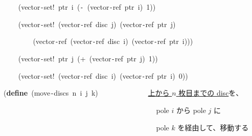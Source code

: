 \documentclass[a4paper,10pt]{article}
\def\mc{\relax}
\begin{document}
\noindent
\mbox{}{\tt\mc \ }{\tt\mc \ }{\tt\mc \ }{\tt\mc \ }(vector{\tt -}set!{\tt\mc \ }ptr{\tt\mc \ }i{\tt\mc \ }({\tt -}{\tt\mc \ }(vector{\tt -}ref{\tt\mc \ }ptr{\tt\mc \ }i){\tt\mc \ }1))

\noindent
\mbox{}{\tt\mc \ }{\tt\mc \ }{\tt\mc \ }{\tt\mc \ }(vector{\tt -}set!{\tt\mc \ }(vector{\tt -}ref{\tt\mc \ }disc{\tt\mc \ }j){\tt\mc \ }(vector{\tt -}ref{\tt\mc \ }ptr{\tt\mc \ }j)

\noindent
\mbox{}{\tt\mc \ }{\tt\mc \ }{\tt\mc \ }{\tt\mc \ }{\tt\mc \ }{\tt\mc \ }{\tt\mc \ }{\tt\mc \ }(vector{\tt -}ref{\tt\mc \ }(vector{\tt -}ref{\tt\mc \ }disc{\tt\mc \ }i){\tt\mc \ }(vector{\tt -}ref{\tt\mc \ }ptr{\tt\mc \ }i)))

\noindent
\mbox{}{\tt\mc \ }{\tt\mc \ }{\tt\mc \ }{\tt\mc \ }(vector{\tt -}set!{\tt\mc \ }ptr{\tt\mc \ }j{\tt\mc \ }(+{\tt\mc \ }(vector{\tt -}ref{\tt\mc \ }ptr{\tt\mc \ }j){\tt\mc \ }1))

\noindent
\mbox{}{\tt\mc \ }{\tt\mc \ }{\tt\mc \ }{\tt\mc \ }(vector{\tt -}set!{\tt\mc \ }(vector{\tt -}ref{\tt\mc \ }disc{\tt\mc \ }i){\tt\mc \ }(vector{\tt -}ref{\tt\mc \ }ptr{\tt\mc \ }i){\tt\mc \ }0))

\noindent
\mbox{}\hfill

\noindent
\mbox{}(\textbf{define}{\tt\mc \ }(move{\tt -}discs{\tt\mc \ }n{\tt\mc \ }i{\tt\mc \ }j{\tt\mc \ }k){\tt\mc \ }{\tt\mc \ }{\tt\mc \ }{\tt\mc \ }{\tt\mc \ }{\tt\mc \ }{\tt\mc \ }{\tt\mc \ }{\tt\mc \ }{\tt\mc \ }{\tt\mc \ }{\tt\mc \ }\rm\mc {\tt ;} \ \underline{\textsf{上から $n$ 枚目までの disc}}を、\hfill
\tt\mc 

\noindent
\mbox{}{\tt\mc \ }{\tt\mc \ }{\tt\mc \ }{\tt\mc \ }{\tt\mc \ }{\tt\mc \ }{\tt\mc \ }{\tt\mc \ }{\tt\mc \ }{\tt\mc \ }{\tt\mc \ }{\tt\mc \ }{\tt\mc \ }{\tt\mc \ }{\tt\mc \ }{\tt\mc \ }{\tt\mc \ }{\tt\mc \ }{\tt\mc \ }{\tt\mc \ }{\tt\mc \ }{\tt\mc \ }{\tt\mc \ }{\tt\mc \ }{\tt\mc \ }{\tt\mc \ }{\tt\mc \ }{\tt\mc \ }{\tt\mc \ }{\tt\mc \ }{\tt\mc \ }{\tt\mc \ }{\tt\mc \ }{\tt\mc \ }{\tt\mc \ }{\tt\mc \ }{\tt\mc \ }{\tt\mc \ }{\tt\mc \ }{\tt\mc \ }\rm\mc {\tt ;} \ pole $i$ から pole $j$ に\hfill
\tt\mc 

\noindent
\mbox{}{\tt\mc \ }{\tt\mc \ }{\tt\mc \ }{\tt\mc \ }{\tt\mc \ }{\tt\mc \ }{\tt\mc \ }{\tt\mc \ }{\tt\mc \ }{\tt\mc \ }{\tt\mc \ }{\tt\mc \ }{\tt\mc \ }{\tt\mc \ }{\tt\mc \ }{\tt\mc \ }{\tt\mc \ }{\tt\mc \ }{\tt\mc \ }{\tt\mc \ }{\tt\mc \ }{\tt\mc \ }{\tt\mc \ }{\tt\mc \ }{\tt\mc \ }{\tt\mc \ }{\tt\mc \ }{\tt\mc \ }{\tt\mc \ }{\tt\mc \ }{\tt\mc \ }{\tt\mc \ }{\tt\mc \ }{\tt\mc \ }{\tt\mc \ }{\tt\mc \ }{\tt\mc \ }{\tt\mc \ }{\tt\mc \ }{\tt\mc \ }\rm\mc {\tt ;} \ pole $k$ を経由して、移動する\hfill
\tt\mc 
\end{document}
